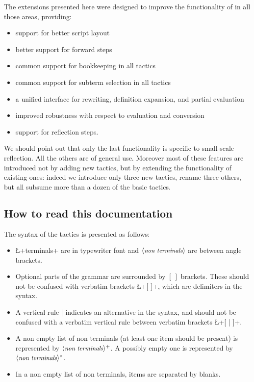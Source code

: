 The extensions presented here were designed to improve the
functionality of \Coq{} in all those areas, providing:

\begin{itemize}
\item support for better script layout
\item better support for forward steps
\item common
support for bookkeeping in all tactics
\item common support for subterm
selection in all tactics
\item a unified interface for rewriting,
definition expansion, and partial evaluation
\item improved robustness
with respect to evaluation and conversion
\item support for reflection
steps.
\end{itemize}
 We should point out that only the last functionality is specific
to small-scale reflection. All the others are of general use.
Moreover most of these features are introduced not
by adding new tactics, but by extending the functionality of existing
ones: indeed we introduce only three new tactics, rename three others,
but all subsume more than a dozen of the basic \Coq{} tactics.


\subsection*{How to read this documentation}


The syntax of the tactics is presented as follows:
\begin{itemize}
\item \L+terminals+ are in typewriter font and $\langle\mbox{\itshape\rmfamily\small non terminals}\rangle$ are
  between angle brackets.
\item Optional parts of the grammar are surrounded by $[\ ]$
  brackets. These should not be confused with verbatim brackets
  \L+[ ]+, which are delimiters in the \ssr{} syntax.
\item A vertical rule $|$ indicates an alternative in the syntax, and
  should not be confused with a
  verbatim vertical rule between verbatim brackets \L+[ | ]+.
\item A non empty list of non terminals (at least one item should be
  present) is represented by $\langle\mbox{\itshape\rmfamily\small non terminals}\rangle^+$. A possibly empty
  one is represented by $\langle\mbox{\itshape\rmfamily\small non terminals}\rangle^*$.
\item In a non empty list of non terminals, items are separated by blanks.
\end{itemize}


